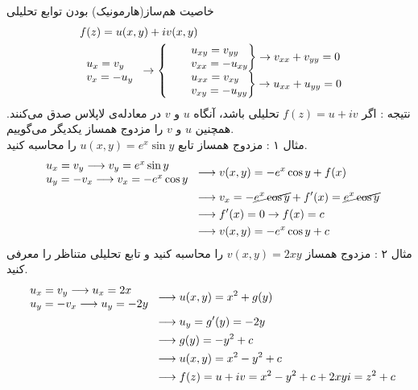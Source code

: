 خاصیت هم‌ساز(هارمونیک) بودن توابع تحلیلی
\[\begin{aligned}
	&\ f(z)=u(x,y)+iv(x,y)
	\\ &\
\begin{tabular}{l}
	$u_x=v_y$
	\\
	$v_x=-u_y$
\end{tabular}\rightarrow
\begin{cases}
	& \begin{rcases}
		& u_{xy}=v_{yy}\\
		& v_{xx}=-u_{xy}
	\end{rcases}\rightarrow v_{xx}+v_{yy}=0
	\\
	& \begin{rcases}
		& u_{xx}=v_{xy}\\
		& v_{xy}=-u_{yy}
	\end{rcases}\rightarrow u_{xx}+u_{yy}=0
\end{cases}
\end{aligned}\]
نتیجه : اگر
$f(z)=u+iv$
تحلیلی باشد، آنگاه
$u$
و
$v$
در معادله‌ی لاپلاس صدق می‌کنند. همچنین
$u$
و
$v$
را مزدوج همساز یکدیگر می‌گوییم.\\
مثال ۱ : مزدوج همساز تابع
$u(x,y)=e^x\sin y$
را محاسبه کنید.
\[\begin{aligned}
	\begin{tabular}{l}
		$u_x=v_y\longrightarrow v_y=e^x\sin y$
		\\
		$u_y=-v_x\longrightarrow v_x=-e^x\cos y$
	\end{tabular} & \longrightarrow
	v(x,y)=-e^x\cos y+f(x)
	\\ &
	\longrightarrow v_x=-\cancel{e^x\cos y}+f^\prime(x)=\cancel{e^x\cos y}
	\\ &
	\longrightarrow f^\prime(x)=0\rightarrow f(x)=c
	\\ &
	\longrightarrow v(x,y)=-e^x\cos y+c
\end{aligned}\]
مثال ۲ : مزدوج همساز
$v(x,y)=2xy$
را محاسبه کنید و تابع تحلیلی متناظر را معرفی کنید.
\[\begin{aligned}
	\begin{tabular}{l}
		$u_x=v_y \longrightarrow u_x=2x$
		\\
		$u_y=-v_x\longrightarrow u_y=-2y$
	\end{tabular}& \longrightarrow u(x,y)=x^2+g(y)
	\\ & \longrightarrow
	u_y=g^\prime(y)=-2y
	\\ & \longrightarrow
	g(y)=-y^2+c
	\\ & \longrightarrow
	u(x,y)=x^2-y^2+c
	\\ & \longrightarrow
	f(z)=u+iv=x^2-y^2+c+2xyi=z^2+c
\end{aligned}\]
